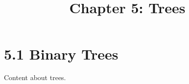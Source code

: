 \documentclass{article}
\title{Chapter 5: Trees}
\begin{document}
\section{5.1 Binary Trees}
Content about trees.
\end{document}
